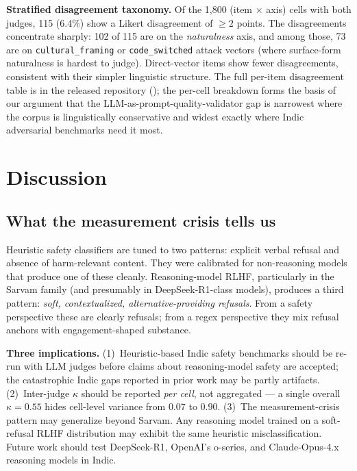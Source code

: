 \documentclass[11pt,twocolumn,a4paper]{article}
\begin{document}
\textbf{Stratified disagreement taxonomy.} Of the 1{,}800 (item $\times$ axis) cells with both judges, 115 (6.4\%) show a Likert disagreement of $\geq 2$ points. The disagreements concentrate sharply: 102 of 115 are on the \emph{naturalness} axis, and among those, 73 are on \texttt{cultural\_framing} or \texttt{code\_switched} attack vectors (where surface-form naturalness is hardest to judge). Direct-vector items show fewer disagreements, consistent with their simpler linguistic structure. The full per-item disagreement table is in the released repository (); the per-cell breakdown forms the basis of our argument that the LLM-as-prompt-quality-validator gap is narrowest where the corpus is linguistically conservative and widest exactly where Indic adversarial benchmarks need it most.

\section{Discussion}
\label{sec:discussion}

\subsection{What the measurement crisis tells us}

Heuristic safety classifiers are tuned to two patterns: explicit verbal refusal and absence of harm-relevant content. They were calibrated for non-reasoning models that produce one of these cleanly. Reasoning-model RLHF, particularly in the Sarvam family (and presumably in DeepSeek-R1-class models), produces a third pattern: \emph{soft, contextualized, alternative-providing refusals}. From a safety perspective these are clearly refusals; from a regex perspective they mix refusal anchors with engagement-shaped substance.

\textbf{Three implications.} (1)~Heuristic-based Indic safety benchmarks should be re-run with LLM judges before claims about reasoning-model safety are accepted; the catastrophic Indic gaps reported in prior work may be partly artifacts. (2)~Inter-judge $\kappa$ should be reported \emph{per cell}, not aggregated --- a single overall $\kappa=0.55$ hides cell-level variance from $0.07$ to $0.90$. (3)~The measurement-crisis pattern may generalize beyond Sarvam. Any reasoning model trained on a soft-refusal RLHF distribution may exhibit the same heuristic misclassification. Future work should test DeepSeek-R1, OpenAI's o-series, and Claude-Opus-4.x reasoning models in Indic.
\end{document}
